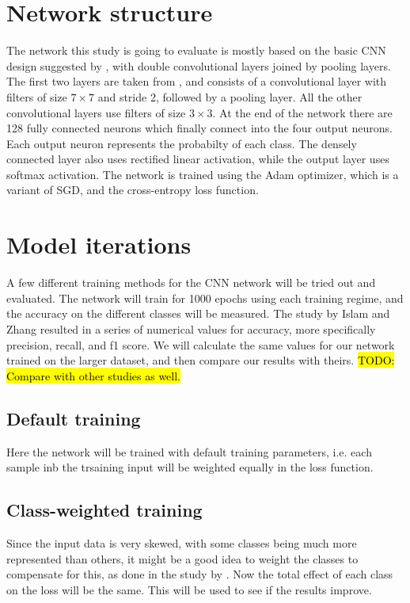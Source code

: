 \documentclass{kththesis}
\begin{document}
\begin{minipage}{.7\linewidth}
  \section{Network structure}
  The network this study is going to evaluate is mostly based on the basic CNN design suggested by \textcite{cnnIntro}, with double convolutional layers joined by pooling layers. The first two layers are taken from \textcite{islam2018early}, and consists of a convolutional layer with filters of size $7 \times 7$ and stride 2, followed by a pooling layer. All the other convolutional layers use filters of size $3 \times 3$. At the end of the network there are 128 fully connected neurons which finally connect into the four output neurons. Each output neuron represents the probabilty of each class. The densely connected layer also uses rectified linear activation, while the output layer uses softmax activation. The network is trained using the Adam optimizer, which is a variant of SGD, and the cross-entropy loss function.
\\
\section{Model iterations}
A few different training methods for the CNN network will be tried out and evaluated. The network will train for \num{1000} epochs using each training regime, and the accuracy on the different classes will be measured. The study by Islam and Zhang resulted in a series of numerical values for accuracy, more specifically precision, recall, and f1 score. We will calculate the same values for our network trained on the larger dataset, and then compare our results with theirs. \hl{TODO: Compare with other studies as well.}

\subsection{Default training}
Here the network will be trained with default training parameters, i.e. each sample inb the trsaining input will be weighted equally in the loss function.

\subsection{Class-weighted training}
  Since the input data is very skewed, with some classes being much more represented than others, it might be a good idea to weight the classes to compensate for this, as done in the study by \textcite{islam2018early}. Now the total effect of each class on the loss will be the same. This will be used to see if the results improve.

\end{minipage}
\end{document}
